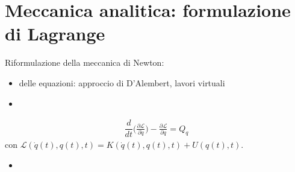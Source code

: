 \documentclass[letterpaper,10pt,english]{jupyterBook}
\begin{document}
\chapter{Meccanica analitica: formulazione di Lagrange}
\label{\detokenize{ch/lagrange:meccanica-analitica-formulazione-di-lagrange}}\label{\detokenize{ch/lagrange:classical-mechanics-lagrange}}\label{\detokenize{ch/lagrange::doc}}
\sphinxAtStartPar
Riformulazione della meccanica di Newton:
\begin{itemize}
\item {} 
\sphinxAtStartPar
{} delle equazioni: approccio di D’Alembert, lavori virtuali

\item {} 
\sphinxAtStartPar
{}

\end{itemize}
\begin{equation*}
\begin{split}\dfrac{d}{dt}\Big( \frac{\partial \mathscr{L}}{\partial \dot{q}} \Big) - \frac{\partial \mathscr{L}}{\partial q} = Q_q\end{split}
\end{equation*}
\sphinxAtStartPar
con \(\mathscr{L}(\dot{q}(t), q(t), t) = K(\dot{q}(t), q(t), t) + U(q(t), t)\).
\begin{itemize}
\item {} 
\sphinxAtStartPar
{}

\end{itemize}
\end{document}
